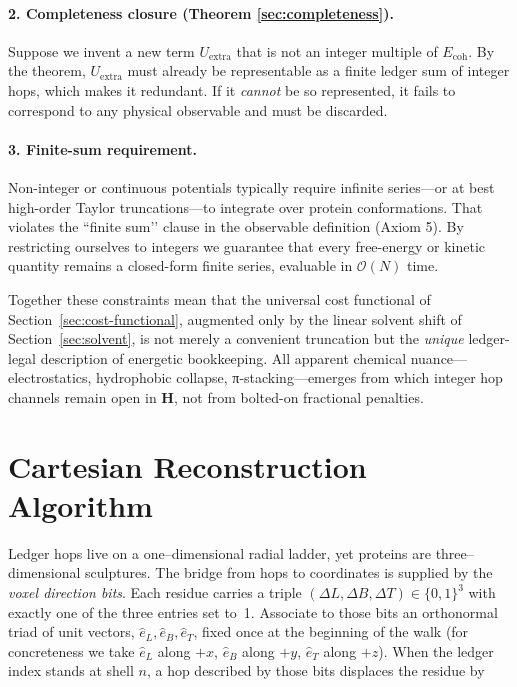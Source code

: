 \documentclass[11pt]{article}
\newcommand{\Eoh}{E_{\mathrm{coh}}}          %
\begin{document}
\paragraph{2.  Completeness closure (Theorem \ref{sec:completeness}).}
Suppose we invent a new term \(U_{\text{extra}}\) that is not an integer
multiple of \(\Eoh\).  By the theorem, \(U_{\text{extra}}\) must already
be representable as a finite ledger sum of integer hops, which makes it
redundant.  If it \emph{cannot} be so represented, it fails to
correspond to any physical observable and must be discarded.

\paragraph{3.  Finite-sum requirement.}
Non-integer or continuous potentials typically require infinite
series—or at best high-order Taylor truncations—to integrate over
protein conformations.  That violates the “finite sum’’ clause in the
observable definition (Axiom 5).  By restricting ourselves to integers
we guarantee that every free-energy or kinetic quantity remains a
closed-form finite series, evaluable in \(\mathcal O(N)\) time.

\smallskip
Together these constraints mean that the universal cost functional of
Section~\ref{sec:cost-functional}, augmented only by the linear solvent
shift of Section~\ref{sec:solvent}, is not merely a convenient truncation
but the \emph{unique} ledger-legal description of energetic bookkeeping.
All apparent chemical nuance—electrostatics, hydrophobic collapse,
π-stacking—emerges from which integer hop channels remain open in
\(\mathbf H\), not from bolted-on fractional penalties.

\section{Cartesian Reconstruction Algorithm}\label{sec:coords}

Ledger hops live on a one–dimensional radial ladder, yet proteins are
three–dimensional sculptures.  The bridge from hops to coordinates is
supplied by the \emph{voxel direction bits}.  Each residue carries a
triple $(\Delta L,\Delta B,\Delta T)\in\{0,1\}^{3}$ with exactly one of
the three entries set to~1.  Associate to those bits an orthonormal
triad of unit vectors,
$\hat e_{L},\hat e_{B},\hat e_{T}$, fixed once at the beginning of the
walk (for concreteness we take $\hat e_{L}$ along $+x$,
$\hat e_{B}$ along $+y$, $\hat e_{T}$ along $+z$).  When the ledger index
stands at shell $n$, a hop described by those bits displaces the residue
by
\end{document}
